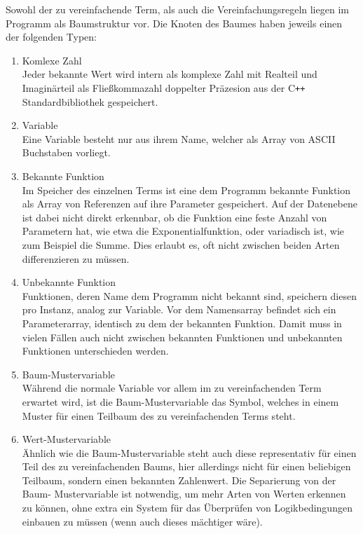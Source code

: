 \documentclass{article}
\begin{document}
Sowohl der zu vereinfachende Term, als auch die Vereinfachungsregeln liegen im Programm als Baumstruktur vor. Die Knoten des Baumes haben jeweils einen der folgenden Typen:
\begin{enumerate}
    \item Komlexe Zahl \\
    Jeder bekannte Wert wird intern als komplexe Zahl mit Realteil und Imaginärteil als Fließkommazahl doppelter Präzesion aus der C\texttt{++} Standardbibliothek gespeichert.
    \item Variable \\
    Eine Variable besteht nur aus ihrem Name, welcher als Array von ASCII Buchstaben vorliegt.
    \item Bekannte Funktion \\
    Im Speicher des einzelnen Terms ist eine dem Programm bekannte Funktion als Array von Referenzen auf ihre Parameter gespeichert. Auf der Datenebene ist dabei nicht direkt erkennbar, ob die Funktion eine feste Anzahl von Parametern hat, wie etwa die Exponentialfunktion, oder variadisch ist, wie zum Beispiel die Summe. Dies erlaubt es, oft nicht zwischen beiden Arten differenzieren zu müssen.
    \item Unbekannte Funktion \\
    Funktionen, deren Name dem Programm nicht bekannt sind, speichern diesen pro Instanz, analog zur Variable. Vor dem Namensarray befindet sich ein Parameterarray, identisch zu dem der bekannten Funktion. Damit muss in vielen Fällen auch nicht zwischen bekannten Funktionen und unbekannten Funktionen unterschieden werden.
    \item Baum-Mustervariable \\
    Während die normale Variable vor allem im zu vereinfachenden Term erwartet wird, ist die Baum-Mustervariable das Symbol, welches in einem Muster für einen Teilbaum des zu vereinfachenden Terms steht. 
    \item Wert-Mustervariable \\
    Ähnlich wie die Baum-Mustervariable steht auch diese representativ für einen Teil des zu vereinfachenden Baums, hier allerdings nicht für einen beliebigen Teilbaum, sondern einen bekannten Zahlenwert. Die Separierung von der Baum- Mustervariable ist notwendig, um mehr Arten von Werten erkennen zu können, ohne extra ein System für das Überprüfen von Logikbedingungen einbauen zu müssen (wenn auch dieses mächtiger wäre).
\end{enumerate}
\clearpage
\end{document}
